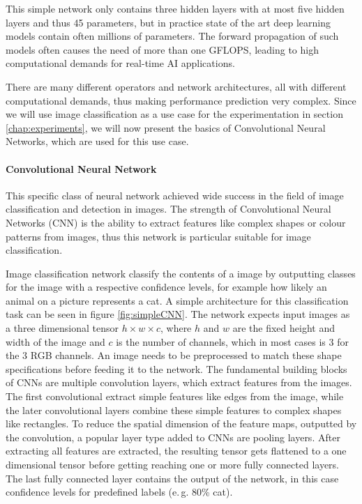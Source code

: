 This simple network only contains three hidden layers with at most five hidden layers and thus 45 parameters, but in practice state of the art deep learning models contain often millions of parameters. 
The forward propagation of such models often causes the need of more than one GFLOPS, leading to high computational demands for real-time AI applications.


There are many different operators and network architectures, all with different computational demands, thus making performance prediction very complex.
Since we will use image classification as a use case for the experimentation in section \ref{chap:experiments}, we will now present the basics of Convolutional Neural Networks, which are used for this use case.

\paragraph{Convolutional Neural Network}
This specific class of neural network achieved wide success in the field of image classification and detection in images.
The strength of Convolutional Neural Networks (CNN) is the ability to extract features like complex shapes or colour patterns from images, thus this network is particular suitable for image classification.

Image classification network classify the contents of a image by outputting classes for the image with a respective confidence levels, for example how likely an animal on a picture represents a cat.
A simple architecture for this classification task can be seen in figure \ref{fig:simpleCNN}.
The network expects input images as a three dimensional tensor $h\times w\times c$, where $h$ and $w$ are the fixed height and width of the image and $c$ is the number of channels, which in most cases is $3$ for the $3$ RGB channels.
An image needs to be preprocessed to match these shape specifications before feeding it to the network.
The fundamental building blocks of CNNs are multiple convolution layers, which extract features from the images. The first convolutional extract simple features like edges from the image, while the later convolutional layers combine these simple features to complex shapes like rectangles.
To reduce the spatial dimension of the feature maps, outputted by the convolution, a popular layer type added to CNNs are pooling layers.
After extracting all features are extracted, the resulting tensor gets flattened to a one dimensional tensor before getting reaching one or more fully connected layers.
The last fully connected layer contains the output of the network, in this case confidence levels for predefined labels (e.\,g. $80$\% cat).  



